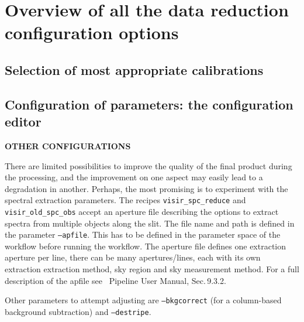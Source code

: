 \section{Overview of all the data reduction configuration options}
\label{sec:configuretion_overview}

\subsection{Selection of most appropriate calibrations}



\subsection{Configuration of parameters: the configuration editor}
\label{sec:configuration_editor}


{\bf OTHER CONFIGURATIONS}

There are limited possibilities to improve the quality of the final 
product during the processing, and the improvement on one aspect 
may easily lead to a degradation in another. Perhaps, the most 
promising is to experiment with the spectral extraction parameters.
The recipes {\tt visir\_spc\_reduce} and {\tt visir\_old\_spc\_obs}
accept an aperture file describing the options to extract spectra 
from multiple objects along the slit. The file name and path is 
defined in the parameter {\tt --apfile}. This has to be defined in 
the parameter space of the workflow before running the workflow. 
The aperture file defines one extraction aperture per line, there 
can be many apertures/lines, each with its own extraction 
extraction method, sky region and sky measurement method. For a 
full description of the apfile see \instname\ Pipeline User Manual,
Sec.\,9.3.2. 

Other parameters to attempt adjusting are {\tt --bkgcorrect} (for a 
column-based background subtraction) and {\tt --destripe}.